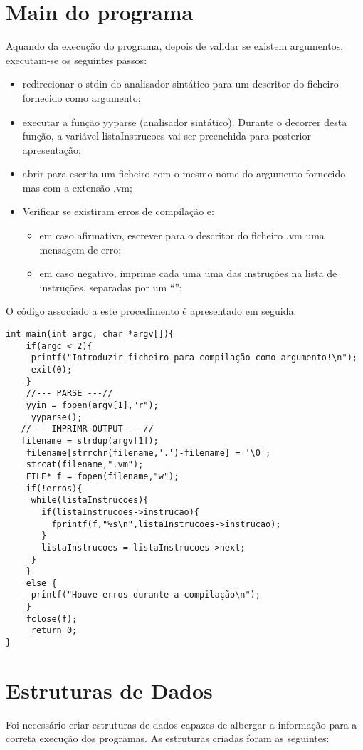 \documentclass{report}
\begin{document}
\section{Main do programa}

Aquando da execução do programa, depois de validar se existem argumentos, executam-se os seguintes passos:

\begin{itemize}
\item redirecionar o stdin do analisador sintático para um descritor do ficheiro fornecido como argumento;
\item executar a função yyparse (analisador sintático). Durante o decorrer desta função, a variável listaInstrucoes vai ser preenchida para posterior apresentação;
\item abrir para escrita um ficheiro com o mesmo nome do argumento fornecido, mas com a extensão .vm;
\item Verificar se existiram erros de compilação e:
\begin{itemize}
\item em caso afirmativo, escrever para o descritor do ficheiro .vm uma mensagem de erro;
\item em caso negativo, imprime cada uma uma das instruções na lista de instruções, separadas por um “\n”;
\end{itemize}
\end{itemize}
O código associado a este procedimento é apresentado em seguida.
\begin{verbatim}
int main(int argc, char *argv[]){
    if(argc < 2){
     printf("Introduzir ficheiro para compilação como argumento!\n");
     exit(0);
    }
    //--- PARSE ---//
    yyin = fopen(argv[1],"r");
     yyparse();
   //--- IMPRIMR OUTPUT ---//
   filename = strdup(argv[1]);
    filename[strrchr(filename,'.')-filename] = '\0';
    strcat(filename,".vm");
    FILE* f = fopen(filename,"w");
    if(!erros){
     while(listaInstrucoes){
       if(listaInstrucoes->instrucao){
         fprintf(f,"%s\n",listaInstrucoes->instrucao);
       }
       listaInstrucoes = listaInstrucoes->next;
     }
    }
    else {
     printf("Houve erros durante a compilação\n");
    }
    fclose(f);
     return 0;
}
\end{verbatim}


\section{Estruturas de Dados}
Foi necessário criar estruturas de dados capazes de albergar a informação para a correta execução dos programas. As estruturas criadas foram as seguintes:
 
\end{document}
